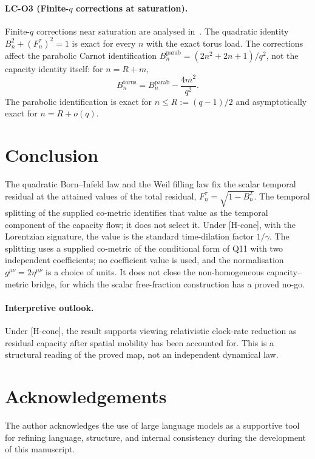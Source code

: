 \documentclass[11pt,a4paper]{article}
\begin{document}
      \paragraph{LC-O3 (Finite-$q$ corrections at saturation).}
        Finite-$q$ corrections near saturation are analysed in~\cite{Beau2026lco3}.
        The quadratic identity $B_n^2 + (F^\tau_n)^2 = 1$ is exact for every $n$ with
        the exact torus load.
        The corrections affect the parabolic Carnot identification
        $B_n^{\mathrm{parab}} = (2n^2+2n+1)/q^2$, not the capacity identity itself:
        for $n = R+m$,
        \[
          B_n^{\mathrm{torus}} = B_n^{\mathrm{parab}} - \frac{4m^2}{q^2}.
        \]
        The parabolic identification is exact for $n \leq R := (q-1)/2$ and
        asymptotically exact for $n = R + o(q)$.

  \section{Conclusion}
  \label{sec:conclusion}

    The quadratic Born--Infeld law and the Weil filling law fix the scalar temporal residual at the attained values
    of the total residual, $F_n^\tau=\sqrt{1-B_n^2}$.
    The temporal splitting of the supplied co-metric identifies that value as the temporal component of the
    capacity flow; it does not select it.
    Under [H-cone], with the Lorentzian signature, the value is the standard time-dilation factor $1/\gamma$.
    The splitting uses a supplied co-metric of the conditional form of Q11 with two independent coefficients; no
    coefficient value is used, and the normalisation $g^{\mu\nu} = 2\eta^{\mu\nu}$ is a choice of units.
    It does not close the non-homogeneous capacity--metric bridge, for which the scalar
    free-fraction construction has a proved no-go.

    \paragraph{Interpretive outlook.}
    Under [H-cone], the result supports viewing relativistic clock-rate reduction as residual capacity after
    spatial mobility has been accounted for.
    This is a structural reading of the proved map, not an independent dynamical law.

  \section*{Acknowledgements}

  The author acknowledges the use of large language models as a supportive tool for refining
  language, structure, and internal consistency during the development of this manuscript.

  \newpage

  
  
\end{document}
